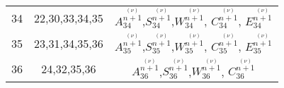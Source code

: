 \begin{center}
\begin{longtable}[htbp]{c c c}
		34	&	22,30,33,34,35	&	$A^{\stackrel{(\nu)}{n+1}}_{34}$,$S^{\stackrel{(\nu)}{n+1}}_{34}$,$W^{\stackrel{(\nu)}{n+1}}_{34}$, $C^{\stackrel{(\nu)}{n+1}}_{34}$, $E^{\stackrel{(\nu)}{n+1}}_{34}$	\\
		35	&	23,31,34,35,36	&	$A^{\stackrel{(\nu)}{n+1}}_{35}$,$S^{\stackrel{(\nu)}{n+1}}_{35}$,$W^{\stackrel{(\nu)}{n+1}}_{35}$, $C^{\stackrel{(\nu)}{n+1}}_{35}$, $E^{\stackrel{(\nu)}{n+1}}_{35}$	\\
		36	&	24,32,35,36	&	$A^{\stackrel{(\nu)}{n+1}}_{36}$,$S^{\stackrel{(\nu)}{n+1}}_{36}$,$W^{\stackrel{(\nu)}{n+1}}_{36}$, $C^{\stackrel{(\nu)}{n+1}}_{36}$ \\
\end{longtable}
\end{center}


